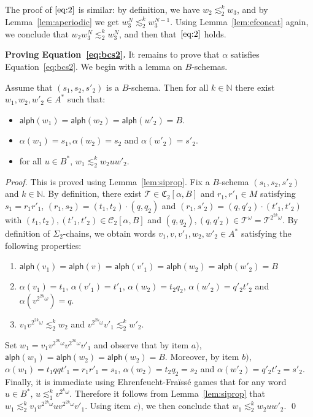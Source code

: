 \documentclass[envcountsame]{llncs}
\newcommand{\efgame}{Ehrenfeucht-Fra\"iss\'e\xspace}
\newcommand\nat{\ensuremath{\mathbb{N}}\xspace}
\newcommand\Cs{\ensuremath{\mathcal{C}}\xspace}
\newcommand\Cstwo{\ensuremath{\Cs_2}\xspace}
\newcommand\fCtwo{\ensuremath{\fC_2}\xspace}
\newcommand\Ts{\ensuremath{\mathcal{T}}\xspace}
\newcommand{\sic}[1]{\ensuremath{\Sigma_{#1}}\xspace}
\newcommand\sieq[2]{\ensuremath{\lesssim^{#1}_{#2}}\xspace}
\newcommand\ksieq[1]{\sieq{k}{#1}}
\newcommand\content[1]{\ensuremath{\contentmorphism(#1)}}
\newcommand\contentmorphism{\ensuremath{\textsf{alph}}}
\newcommand\qchains[1]{\ensuremath{\sic{#1}}-chains\xspace}
\newcommand\dchains{\qchains{2}}
\newcommand\fC{\ensuremath{\mathfrak C}\xspace}
\begin{document}
The proof of $\eqref{eq:2}$ is similar: by definition, we have $w_2 \ksieq{2} w_3$, and by
Lemma~\ref{lem:aperiodic} we get $w_3^{N} \ksieq{2} w_3^{N-1}$. Using
Lemma~\ref{lem:efconcat} again, we conclude that $w_2w_3^{N}\ksieq{2}w_3^{N}$, and then
that~$\eqref{eq:2}$ holds.

\medskip
\noindent
{\bf Proving Equation~\eqref{eq:bcs2}.} It remains to prove that
$\alpha$ satisfies Equation~\eqref{eq:bcs2}. We begin with a lemma
on $B$-schemas.

\begin{lemma} \label{lem:schemprop}
  Assume that $(s_1,s_2,s'_2)$ is a $B$-schema. Then for all $k \in
  \nat$ there exist $w_1,w_2,w'_2 \in A^*$ such that:
  \begin{itemize}
  \item $\content{w_1} = \content{w_2} = \content{w'_2} = B$.
  \item $\alpha(w_1) = s_1, \alpha(w_2)=s_2$ and $\alpha(w'_2) = s'_2$.
  \item for all $u \in B^*$, $w_1 \ksieq{2} w_2uw'_2$.
  \end{itemize}
\end{lemma}

\begin{proof}
  This is proved using Lemma~\ref{lem:siprop}. Fix a $B$-schema
  $(s_1,s_2,s'_2)$ and $k \in \nat$. By definition, there exist $\Ts \in
  \fCtwo[\alpha,B]$ and $r_1,r'_1 \in M$ satisfying $s_1 = r_1r'_1$,
  $(r_1,s_2) = (t_1,t_2) \cdot (q,q_2)$ and $(r_1,s'_2) = (q,q'_2) \cdot
  (t'_1,t'_2)$ with $(t_1,t_2),(t'_1,t'_2) \in \Cstwo[\alpha,B]$ and
  $(q,q_2),(q,q'_2) \in \Ts^\omega = \Ts^{2^{2k}\omega}$. By definition
  of \dchains, we obtain words $v_1,v,v'_1,w_2,w'_2 \in A^*$ satisfying
  the following properties:
  \begin{enumerate}[label=$\alph*)$]
  \item $\content{v_1} = \content{v} = \content{v'_1} =\content{w_2}
    =\content{w'_2} = B$
  \item $\alpha(v_1) = t_1$,
    $\alpha(v'_1) = t'_1$, $\alpha(w_2) = t_2q_2$, $\alpha(w'_2) =
    q'_2t'_2$ and $\alpha(v^{2^{2k}\omega}) = q$.
  \item $v_1v^{2^{2k}\omega}
    \ksieq{2} w_2$ and $v^{2^{2k}\omega}v'_1 \ksieq{2} w'_2$.
  \end{enumerate}

  Set $w_1 = v_1v^{2^{2k}\omega}v^{2^{2k}\omega}v'_1$ and observe that
  by item $a)$, $\content{w_1} = \content{w_2} = \content{w_2} =
  B$. Moreover, by item $b)$, $\alpha(w_1) = t_1qqt'_1 = r_1r'_1= s_1$,
  $\alpha(w_2) = t_2q_2 = s_2$ and $\alpha(w'_2) = q'_2t'_2 =
  s'_2$. Finally, it is immediate using \efgame games that for any
  word $u \in B^*$, $u \ksieq{1} v^{2^k\omega}$. Therefore it follows
  from Lemma~\ref{lem:siprop} that $w_1 \ksieq{2}
  v_1v^{2^{2k}\omega}uv^{2^{2k}\omega}v'_1$. Using item $c)$, we then
  conclude that $w_1 \ksieq{2} w_2uw'_2$. \qed  
\end{proof}
\end{document}
